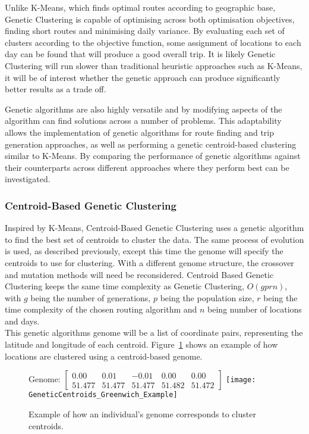 \noindent
Unlike K-Means, which finds optimal routes according to geographic base, Genetic Clustering is capable of optimising
across both optimisation objectives, finding short routes and minimising daily variance.
By evaluating each set of clusters according to the objective function, some assignment of locations to each day can be
found that will produce a good overall trip.
It is likely Genetic Clustering will run slower than traditional heuristic approaches such as K-Means, it will be of
interest whether the genetic approach can produce significantly better results as a trade off.

Genetic algorithms are also highly versatile and by modifying aspects of the algorithm can find solutions across a
number of problems.
This adaptability allows the implementation of genetic algorithms for route finding and trip generation approaches, as well
as performing a genetic centroid-based clustering similar to K-Means.
By comparing the performance of genetic algorithms against their counterparts across different approaches where they
perform best can be investigated.

\subsubsection{Centroid-Based Genetic Clustering}
Inspired by K-Means, Centroid-Based Genetic Clustering uses a genetic algorithm to find the best set of centroids
to cluster the data.
The same process of evolution is used, as described previously, except this time the genome will specify the
centroids to use for clustering.
With a different genome structure, the crossover and mutation methods will need be reconsidered.
Centroid Based Genetic Clustering keeps the same time complexity as Genetic Clustering, $O(g p r n)$, with $g$
being the number of generations, $p$ being the population size, $r$ being the time complexity of the chosen
routing algorithm and $n$ being number of locations and days.\\

\noindent
This genetic algorithms genome will be a list of coordinate pairs, representing the latitude and longitude of each
centroid.
Figure~\ref{fig:GeneticCentroids_Greenwich_Example} shows an example of how locations are clustered using a centroid-based genome.
\begin{figure}[H]
    \centering
    Genome: $\begin{bmatrix}0.00 & 0.01 & -0.01 & 0.00 & 0.00\\51.477 & 51.477 & 51.477 & 51.482 & 51.472\end{bmatrix}$
    \texttt{[image: GeneticCentroids\_Greenwich\_Example]}
    \caption{Example of how an individual's genome corresponds to cluster centroids.}
    \label{fig:GeneticCentroids_Greenwich_Example}
\end{figure}

